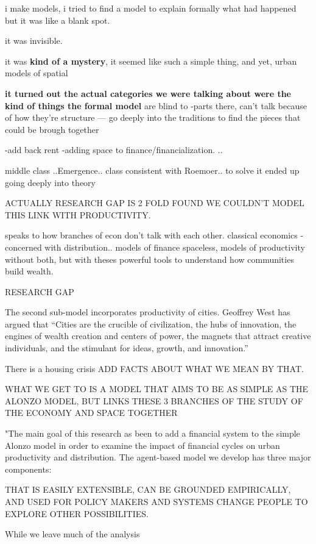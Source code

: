 i make models, i tried to find a model to explain formally what had happened
but it was like a blank spot. 

it was invisible. 

it was \textbf{kind of a mystery}, it seemed like such a simple thing, and yet, 
urban models of spatial 


\textbf{it turned out the actual categories we were talking about were the kind of things the formal model} are blind to
-parts there, can't talk because of how they're structure --- go deeply into the traditions to find the pieces that could be brough together

-add back rent
-adding space to finance/financialization.
..


\gls{middle class}
..Emergence..
class consistent with Roemoer.. 
to solve it ended up going deeply into theory

ACTUALLY RESEARCH GAP IS 2 FOLD
FOUND WE COULDN'T MODEL THIS LINK WITH PRODUCTIVITY.


speaks to how branches of econ don't talk with each other. classical economics - concerned with distribution.. models of finance spaceless, models of productivity without both, but with theses powerful tools to understand how communities build wealth.


RESEARCH GAP

The second sub-model incorporates  productivity of cities. Geoffrey West has argued that ``Cities are the crucible of civilization, the hubs of innovation, the engines of wealth creation and centers of power, the magnets that attract creative individuals, and the stimulant for ideas, growth, and innovation.'' \cite{westScaleUniversalLaws2017} 


There is a housing crisis ADD FACTS ABOUT WHAT WE MEAN BY THAT.



WHAT WE GET TO IS A MODEL THAT AIMS TO BE AS SIMPLE AS THE ALONZO MODEL, BUT LINKS THESE 3 BRANCHES OF THE STUDY OF THE ECONOMY AND SPACE TOGETHER

"The main goal of this research as been to add a financial system to the simple Alonzo model in order to examine the impact of financial cycles on urban productivity and distribution. The \gls{agent-based model} we develop has three major components: 

THAT IS EASILY EXTENSIBLE, CAN BE GROUNDED EMPIRICALLY, AND USED FOR POLICY MAKERS AND SYSTEMS CHANGE PEOPLE TO EXPLORE OTHER POSSIBILITIES.


While we leave much of the analysis



